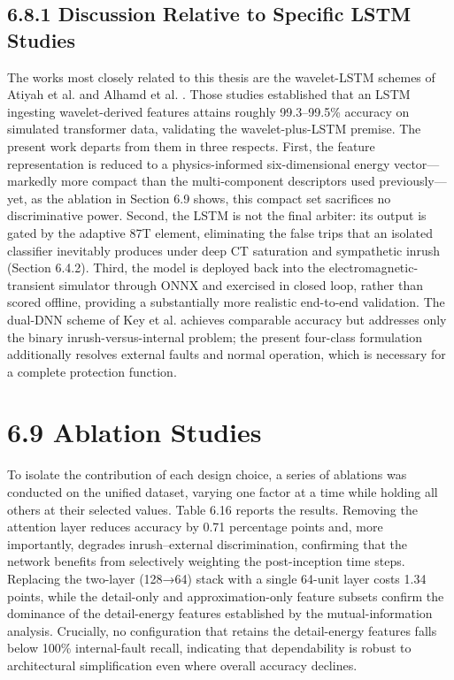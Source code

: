 \subsection{6.8.1  Discussion Relative to Specific LSTM Studies}
The works most closely related to this thesis are the wavelet-LSTM schemes of Atiyah et al. \cite{ref3} and Alhamd et al. \cite{ref1, ref2}. Those studies established that an LSTM ingesting wavelet-derived features attains roughly 99.3--99.5\% accuracy on simulated transformer data, validating the wavelet-plus-LSTM premise. The present work departs from them in three respects. First, the feature representation is reduced to a physics-informed six-dimensional energy vector---markedly more compact than the multi-component descriptors used previously---yet, as the ablation in Section 6.9 shows, this compact set sacrifices no discriminative power. Second, the LSTM is not the final arbiter: its output is gated by the adaptive 87T element, eliminating the false trips that an isolated classifier inevitably produces under deep CT saturation and sympathetic inrush (Section 6.4.2). Third, the model is deployed back into the electromagnetic-transient simulator through ONNX and exercised in closed loop, rather than scored offline, providing a substantially more realistic end-to-end validation. The dual-DNN scheme of Key et al. \cite{ref23} achieves comparable accuracy but addresses only the binary inrush-versus-internal problem; the present four-class formulation additionally resolves external faults and normal operation, which is necessary for a complete protection function.


\section{6.9  Ablation Studies}
To isolate the contribution of each design choice, a series of ablations was conducted on the unified dataset, varying one factor at a time while holding all others at their selected values. Table 6.16 reports the results. Removing the attention layer reduces accuracy by 0.71 percentage points and, more importantly, degrades inrush--external discrimination, confirming that the network benefits from selectively weighting the post-inception time steps. Replacing the two-layer (128→64) stack with a single 64-unit layer costs 1.34 points, while the detail-only and approximation-only feature subsets confirm the dominance of the detail-energy features established by the mutual-information analysis. Crucially, no configuration that retains the detail-energy features falls below 100\% internal-fault recall, indicating that dependability is robust to architectural simplification even where overall accuracy declines.

